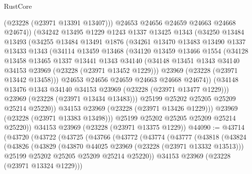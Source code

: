 \begin{lexlean}{RustCore}
\begin{coremodule}
                (@23228 (@23971 @13391 @13407)))
              @24653
              @24656
              @24659
              @24663
              @24668
              @24674))
          (@34242
            @13495
            @1229
            @1243
            @1337
            @13425
            @1343
            (@34250
              @13484
              @13493
              (@34255
                @13484
                @13491
                @1876
                (@34261
                  @13470
                  @13483
                  @13490
                  @1337
                  @13433
                  @1343
                  (@34114
                    @13459
                    @13468
                    (@34120
                      @13459
                      @13466
                      @1554
                      (@34128
                        @13458
                        @13465
                        @1337
                        @13441
                        @1343
                        @34140
                        (@34148 @13451 @1343 @34140 @34153 @23969 (@23228 (@23971 @13452 @1229)))
                        @23969
                        (@23228 (@23971 @13442 @13458)))
                      @24653
                      @24656
                      @24659
                      @24663
                      @24668
                      @24674))
                  (@34148 @13476 @1343 @34140 @34153 @23969 (@23228 (@23971 @13477 @1229)))
                  @23969
                  (@23228 (@23971 @13434 @13483)))
                @25199
                @25202
                @25205
                @25209
                @25214
                @25220))
            @34153
            @23969
            (@23228 (@23971 @13426 @1229)))
          @23969
          (@23228 (@23971 @13383 @13498)))
        @25199
        @25202
        @25205
        @25209
        @25214
        @25220))
    @34153
    @23969
    (@23228 (@23971 @13375 @1229))
@44090 := @43714
    (@43720
      (@43722
        (@43725
          (@43766
            (@43772
              (@43774
                (@43777
                  (@43818
                    (@43824
                      (@43826
                        (@43829
                          (@43870 @44025 @23969 (@23228 (@23971 @13332 @13513)))
                          @25199
                          @25202
                          @25205
                          @25209
                          @25214
                          @25220))
                      @34153
                      @23969
                      (@23228 (@23971 @13324 @1229)))

\end{coremodule}
\end{lexlean}
